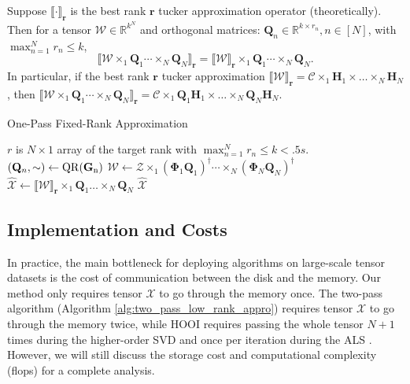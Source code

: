 \begin{lem}
\label{lemma: equivalance_one_pass}
Suppose $\llbracket  \cdot \rrbracket_{\mathbf{r}}$ is the best rank $\mathbf{r}$ tucker approximation operator (theoretically). Then for a tensor $\mathscr{W}\in \mathbb{R}^{k^N}$ and orthogonal matrices: $\mathbf{Q}_n \in \mathbb{R}^{k\times r_n}, n\in [N]$, with $\max_{n=1}^N r_n \le k$,
\begin{equation}
\llbracket \mathscr{W}\times_1 \mathbf{Q}_1 \cdots \times_N \mathbf{Q}_N \rrbracket_\mathbf{r} = 
\llbracket \mathscr{W} \rrbracket_\mathbf{r} \times_1 \mathbf{Q}_1 \cdots \times_N \mathbf{Q}_N.
\end{equation}
In particular, if the best rank $\mathbf{r}$ tucker approximation  $\llbracket \mathscr{W} \rrbracket_\mathbf{r} =  \mathscr{C} \times_1 \mathbf{H}_1 \times \dots \times_N \mathbf{H}_N$, then 
$\llbracket \mathscr{W}\times_1 \mathbf{Q}_1 \cdots \times_N \mathbf{Q}_N \rrbracket_\mathbf{r} =  \mathscr{C} \times_1 \mathbf{Q}_1\mathbf{H}_1 \times \dots \times_N \mathbf{Q}_N\mathbf{H}_N$. 
\end{lem}



\begin{algorithm}[ht]
\caption{One-Pass Fixed-Rank Approximation}\label{alg:one_pass_fix_rank_appro}
  \begin{algorithmic}[1]
  \Require $r$ is $N\times 1$ array of the target rank with $\max_{n=1}^N r_n \le k<.5s$. 
  \State $(\mathbf{Q}_n, \sim) \leftarrow \rm{QR}(\mathbf{G}_n)$ 
  \EndFor 
  \State $\mathscr{W} \leftarrow \mathscr{Z}\times_1 (\mathbf{\Phi}_1\mathbf{Q}_1)^\dag \cdots \times_N (\mathbf{\Phi}_N\mathbf{Q}_N)^\dag $
  \State $\hat{\mathscr{X}} \leftarrow \llbracket \mathscr{W} \rrbracket _\mathbf{r} \times_1 \mathbf{Q}_1 \dots \times_N \mathbf{Q}_N$
  \State \Return $\hat{\mathscr{X}}$ 
  \EndFunction
\end{algorithmic}
\end{algorithm}
\subsection{Implementation and Costs} 

In practice, the main bottleneck for deploying algorithms on large-scale tensor datasets is the cost of communication between the disk and the memory. Our method only requires tensor $\mathscr{X}$ to go through the memory once. The two-pass algorithm (Algorithm \ref{alg:two_pass_low_rank_appro}) requires tensor $\mathscr{X}$ to go through the memory twice, while HOOI requires passing the whole tensor $N+1$ times during the higher-order SVD and once per iteration during the ALS . However, we will still discuss the storage cost and computational complexity (flops) for a complete analysis. 

